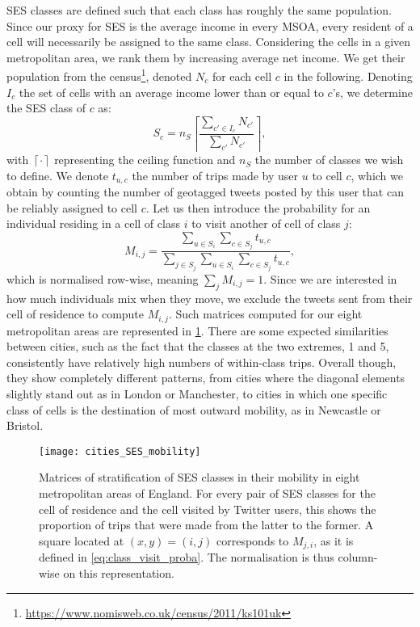 \documentclass[../thesis.tex]{subfiles}
\begin{document}
\Ac{SES} classes are defined such that each class has roughly the same population. Since
our proxy for \ac{SES} is the average income in every \ac{MSOA}, every resident of a
cell will necessarily be assigned to the same class. Considering the cells in a given
metropolitan area, we rank them by increasing average net income. We get their
population from the
census\footnote{\url{https://www.nomisweb.co.uk/census/2011/ks101uk}}, denoted $N_c$ for
each cell $c$ in the following. Denoting $I_c$ the set of cells with an average income
lower than or equal to $c$'s, we determine the \ac{SES} class of $c$ as:
\begin{equation}
  S_c = n_S \left\lceil \frac{\sum_{c' \in I_c} N_{c'}}{\sum_{c'} N_{c'}} \right\rceil,
\end{equation}
with $\left\lceil \cdot \right\rceil$ representing the ceiling function and $n_S$ the
number of classes we wish to define. We denote $t_{u, c}$ the number of trips made by
user $u$ to cell $c$, which we obtain by counting the number of geotagged tweets posted
by this user that can be reliably assigned to cell $c$. Let us then introduce the
probability for an individual residing in a cell of class $i$ to visit another of cell
of class $j$:
\begin{equation}
  \label{eq:class_visit_proba}
  M_{i, j} = \frac{
      \sum_{u \in S_i} \sum_{c \in S_j} t_{u, c}
    }{
      \sum_{j \in S_j} \sum_{u \in S_i} \sum_{c \in S_j} t_{u, c}
    },
\end{equation}
which is normalised row-wise, meaning $\sum_j M_{i, j} = 1$. Since we are interested in
how much individuals mix when they move, we exclude the tweets sent from their cell of
residence to compute $M_{i, j}$. Such matrices computed for our eight metropolitan areas
are represented in \cref{fig:cities_SES_mobility}. There are some expected similarities
between cities, such as the fact that the classes at the two extremes, 1 and 5,
consistently have relatively high numbers of within-class trips. Overall though, they
show completely different patterns, from cities where the diagonal elements slightly
stand out as in London or Manchester, to cities in which one specific class of cells is
the destination of most outward mobility, as in Newcastle or Bristol. 
\begin{figure}
\centering
  \texttt{[image: cities\_SES\_mobility]}
  \caption{ Matrices of stratification of \ac{SES} classes in their mobility in eight
  metropolitan areas of England. For every pair of \ac{SES} classes for the cell of
  residence and the cell visited by Twitter users, this shows the proportion of trips
  that were made from the latter to the former. A square located at $(x, y) = (i, j)$
  corresponds to $M_{j, i}$, as it is defined in \cref{eq:class_visit_proba}. The
  normalisation is thus column-wise on this representation.}
  \label{fig:cities_SES_mobility}
\end{figure}
\end{document}
